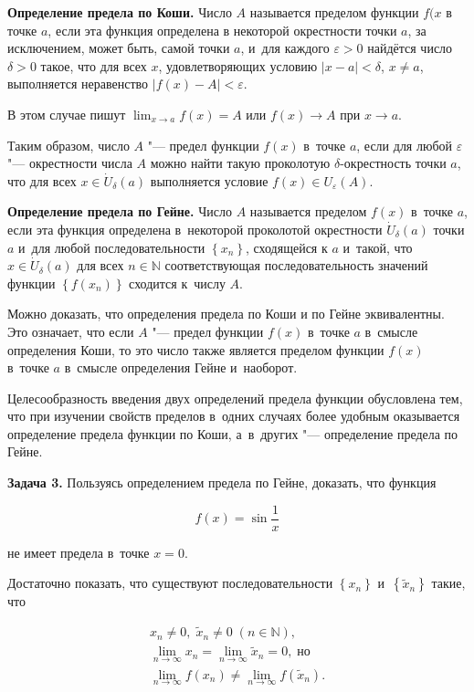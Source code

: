 
\textbf{Определение предела по Коши.} Число $A$ называется пределом функции $f(x
$ в точке $a$, если эта функция определена в некоторой окрестности точки $a$,
за исключением, может быть, самой точки $a$, и~для каждого $\varepsilon > 0$
найдётся число $\delta > $0 такое, что для всех $x$, удовлетворяющих условию
$|x - a| < \delta$, $x \ne a$, выполняется неравенство
$|f(x) - A| < \varepsilon$.

В этом случае пишут $\displaystyle \lim_{x \to a} f(x) = A$ или $f(x) \to A$
при $x \to a$.

Таким образом, число $A$ "--- предел функции $f(x)$ в~точке $a$, если для любой
$\varepsilon$ "--- окрестности числа $A$ можно найти такую проколотую
$\delta$-окрестность точки $a$, что для всех $x \in \dot U_{\delta}(a)$
выполняется условие $f(x) \in U_{\varepsilon}(A)$.

\textbf{Определение предела по Гейне.} Число $A$ называется пределом $f(x)$
в~точке $a$, если эта функция определена в~некоторой проколотой окрестности
$\dot U_{\delta}(a)$ точки $a$ и~для любой последовательности $\left\{ x_{n}\right\}$,
сходящейся к $a$ и~такой, что $x \in \dot U_{\delta}(a)$ для всех $n \in \mathbb{N}$
соответствующая последовательность значений функции $\left\{ f(x_{n}) \right\}$
сходится к~числу $A$.

Можно доказать, что определения предела по Коши и по Гейне эквивалентны.
Это означает, что если $A$ "--- предел функции $f(x)$ в~точке $a$ в~смысле
определения Коши, то это число также является пределом функции $f(x)$
в~точке $a$ в~смысле определения Гейне и~наоборот.

Целесообразность введения двух определений предела функции обусловлена тем,
что при изучении свойств пределов в~одних случаях более удобным оказывается
определение предела функции по Коши, а~в~других "--- определение предела по Гейне.

\textbf{Задача 3.}\label{ex:4_1_2_3} Пользуясь определением предела по Гейне,
доказать, что функция

\begin{equation*}
\displaystyle f(x) = \sin \frac{1}{x}
\end{equation*}

\noindent
не имеет предела в~точке $x = 0$.

Достаточно показать, что существуют последовательности $\left\{ x_{n} \right\}$
и~$\left\{ \tilde x_{n} \right\}$ такие, что

\begin{gather*}
x_{n} \ne 0, \; \tilde x_{n} \ne 0 \; (n \in \mathbb{N}), \\
\displaystyle \lim_{n \to \infty} x_{n} =
\lim_{n \to \infty} \tilde x_{n} = 0, \; \text{но} \\
\displaystyle \lim_{n \to \infty} f(x_{n}) \ne \lim_{n \to \infty} f(\tilde x_{n}).
\end{gather*}

